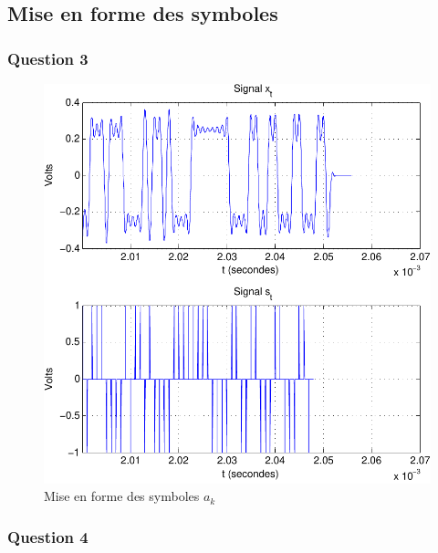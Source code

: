 \documentclass[a4paper,11pt]{article}
\begin{document}
\subsection{Mise en forme des symboles}

\subsubsection*{Question 3}

\begin{figure}[htb]
	\begin{center}
	\includegraphics[scale=1]{question3-crop.pdf}
	\caption{Mise en forme des symboles $a_k$}
	\label{fig:ques3}
	\end{center}
\end{figure} 

\subsubsection*{Question 4}
\end{document}
